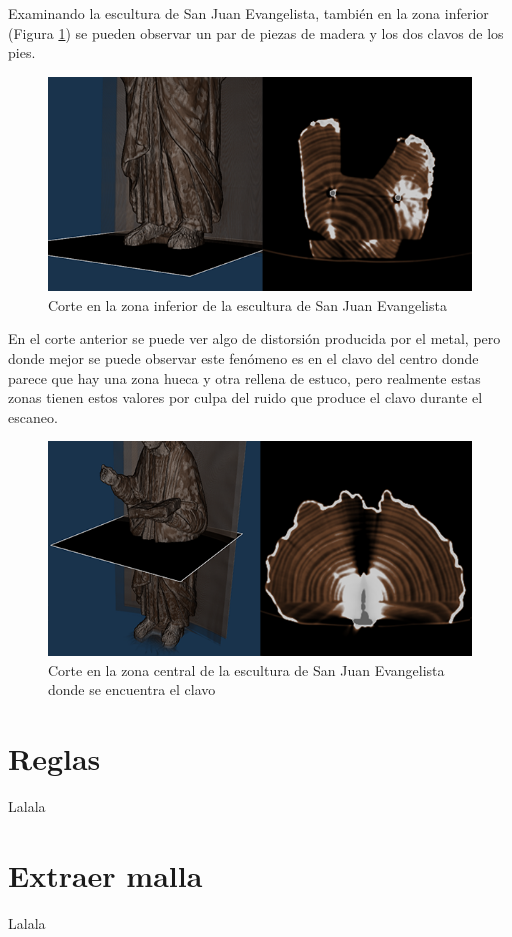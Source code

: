 Examinando la escultura de San Juan Evangelista, también en la zona inferior (Figura \ref{fig:corte_san_juan_evangelista_clavos_pies}) se pueden observar un par de piezas de madera y los dos clavos de los pies.

\begin{figure}[H]
	\centering
	\includegraphics[width=12.5cm]{imagenes/corte_san_juan_evangelista_clavos_pies}
	\caption{Corte en la zona inferior de la escultura de San Juan Evangelista}
	\label{fig:corte_san_juan_evangelista_clavos_pies}
\end{figure}

En el corte anterior se puede ver algo de distorsión producida por el metal, pero donde mejor se puede observar este fenómeno es en el clavo del centro donde parece que hay una zona hueca y otra rellena de estuco, pero realmente estas zonas tienen estos valores por culpa del ruido que produce el clavo durante el escaneo.

\begin{figure}[H]
	\centering
	\includegraphics[width=12.5cm]{imagenes/corte_san_juan_evangelista_clavo}
	\caption{Corte en la zona central de la escultura de San Juan Evangelista donde se encuentra el clavo}
	\label{fig:corte_san_juan_evangelista_clavo}
\end{figure}

\section{Reglas}

Lalala

\section{Extraer malla}

Lalala
